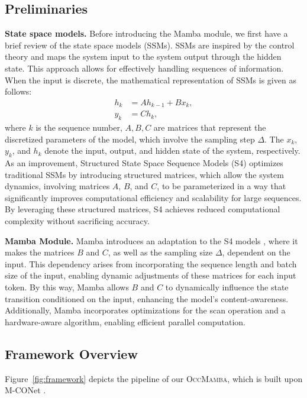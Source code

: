 \documentclass[10pt,twocolumn,letterpaper]{article}
\newcommand{\methodname}{\textsc{OccMamba}}
\begin{document}
\subsection{Preliminaries}
\label{sec:prelim}

\textbf{State space models.}
Before introducing the Mamba module, we first have a brief review of the state space models (SSMs). SSMs are inspired by the control theory and maps the system input to the system output through the hidden state. This approach allows for effectively handling sequences of information. When the input is discrete, the mathematical representation of SSMs is given as follows:
\begin{align}
  h_k &= A h_{k-1} + B x_k, \label{eq:ssm1} \\
  y_k &= C h_k, \label{eq:ssm2}
\end{align}
where $k$ is the sequence number, $A, B, C$ are matrices that represent the discretized parameters of the model, which involve the sampling step $\Delta$. The $x_k$, $y_k$, and $h_k$ denote the input, output, and hidden state of the system, respectively. As an improvement, Structured State Space Sequence Models (S4) \cite{yinhaoli2020} optimizes traditional SSMs by introducing structured matrices, which allow the system dynamics, involving matrices $A$, $B$, and $C$, to be parameterized in a way that significantly improves computational efficiency and scalability for large sequences. By leveraging these structured matrices, S4 achieves reduced computational complexity without sacrificing accuracy.

\textbf{Mamba Module.}
Mamba introduces an adaptation to the S4 models \cite{yinhaoli2020}, where it makes the matrices $B$ and $C$, as well as the sampling size $\Delta$, dependent on the input. This dependency arises from incorporating the sequence length and batch size of the input, enabling dynamic adjustments of these matrices for each input token. By this way, Mamba allows $B$ and $C$ to dynamically influence the state transition conditioned on the input, enhancing the model's content-awareness. Additionally, Mamba incorporates optimizations for the scan operation and a hardware-aware algorithm, enabling efficient parallel computation.

\subsection{Framework Overview}
\label{sec:framework}

Figure~\ref{fig:framework} depicts the pipeline of our \methodname{}, which is built upon M-CONet \cite{luisroldao}.
\end{document}
